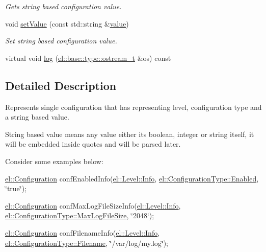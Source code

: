 \begin{DoxyCompactItemize}
\begin{DoxyCompactList}\small\item\em Gets string based configuration value. \end{DoxyCompactList}\item 
void \hyperlink{classel_1_1_configuration_a04755de11422d7570869433ea157b705}{set\+Value} (const std\+::string \&\hyperlink{classel_1_1_configuration_ab31605eb195a222cf32baa4922bb9a3c}{value})
\begin{DoxyCompactList}\small\item\em Set string based configuration value. \end{DoxyCompactList}\item 
virtual void \hyperlink{classel_1_1_configuration_a82c87e1a93211a1d21da99570f47dd49}{log} (\hyperlink{namespaceel_1_1base_1_1type_a74ea109bf34d1c44926837fb0830f445}{el\+::base\+::type\+::ostream\+\_\+t} \&os) const 
\end{DoxyCompactItemize}


\subsection{Detailed Description}
Represents single configuration that has representing level, configuration type and a string based value. 

String based value means any value either its boolean, integer or string itself, it will be embedded inside quotes and will be parsed later.

Consider some examples below\+:
\begin{DoxyItemize}
\item \hyperlink{classel_1_1_configuration}{el\+::\+Configuration} conf\+Enabled\+Info(\hyperlink{namespaceel_ab0ac6091262344c52dd2d3ad099e8e36a4059b0251f66a18cb56f544728796875}{el\+::\+Level\+::\+Info}, \hyperlink{namespaceel_a281f5db6d6163678bc68a8b23b59e124a00d23a76e43b46dae9ec7aa9dcbebb32}{el\+::\+Configuration\+Type\+::\+Enabled}, \char`\"{}true\char`\"{});
\item \hyperlink{classel_1_1_configuration}{el\+::\+Configuration} conf\+Max\+Log\+File\+Size\+Info(\hyperlink{namespaceel_ab0ac6091262344c52dd2d3ad099e8e36a4059b0251f66a18cb56f544728796875}{el\+::\+Level\+::\+Info}, \hyperlink{namespaceel_a281f5db6d6163678bc68a8b23b59e124a4b35e615142d60db6383426f051e700b}{el\+::\+Configuration\+Type\+::\+Max\+Log\+File\+Size}, \char`\"{}2048\char`\"{});
\item \hyperlink{classel_1_1_configuration}{el\+::\+Configuration} conf\+Filename\+Info(\hyperlink{namespaceel_ab0ac6091262344c52dd2d3ad099e8e36a4059b0251f66a18cb56f544728796875}{el\+::\+Level\+::\+Info}, \hyperlink{namespaceel_a281f5db6d6163678bc68a8b23b59e124a1351017ac6423911223bc19a8cb7c653}{el\+::\+Configuration\+Type\+::\+Filename}, \char`\"{}/var/log/my.\+log\char`\"{}); 
\end{DoxyItemize}

